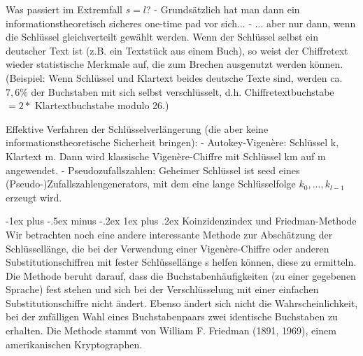\documentclass[a4paper]{article}
\makeatletter
\renewcommand{\subsubsection}{\@startsection{subsubsection}{3}{0mm}%
 {-1ex plus -.5ex minus -.2ex}%
 {1ex plus .2ex}%
 {\normalfont\small\bfseries}}
\makeatother
\begin{document}
\begin{multicols}{3}
    Was passiert im Extremfall $s=l$?
    - Grundsätzlich hat man dann ein informationstheoretisch sicheres one-time pad vor sich...
    - ... aber nur dann, wenn die Schlüssel gleichverteilt gewählt werden.  Wenn der Schlüssel selbst ein deutscher Text ist (z.B. ein Textstück aus einem Buch), so weist der Chiffretext wieder statistische Merkmale auf, die zum Brechen ausgenutzt werden können. (Beispiel: Wenn Schlüssel und Klartext beides deutsche Texte sind, werden ca. $7,6\%$ der Buchstaben mit sich selbst verschlüsselt, d.h. Chiffretextbuchstabe$= 2 *$ Klartextbuchstabe modulo 26.)

    Effektive Verfahren der Schlüsselverlängerung (die aber keine informationstheoretische Sicherheit bringen):
    - Autokey-Vigenère: Schlüssel k, Klartext m. Dann wird klassische Vigenère-Chiffre mit Schlüssel km auf m angewendet.
    - Pseudozufallszahlen: Geheimer Schlüssel ist seed eines (Pseudo-)Zufallszahlengenerators, mit dem eine lange Schlüsselfolge $k_0,...,k_{l-1}$ erzeugt wird.

    \subsubsection{Koinzidenzindex und Friedman-Methode}
    Wir betrachten noch eine andere interessante Methode zur Abschätzung der Schlüssellänge, die bei der Verwendung einer Vigenère-Chiffre oder anderen Substitutionschiffren mit fester Schlüssellänge s helfen können, diese zu ermitteln. Die Methode beruht darauf, dass die Buchstabenhäufigkeiten (zu einer gegebenen Sprache) fest stehen und sich bei der Verschlüsselung mit einer einfachen Substitutionschiffre nicht ändert. Ebenso ändert sich nicht die Wahrscheinlichkeit, bei der zufälligen Wahl eines Buchstabenpaars zwei identische Buchstaben zu erhalten. Die Methode stammt von William F. Friedman (1891, 1969), einem amerikanischen Kryptographen.


\end{multicols}
\end{document}
